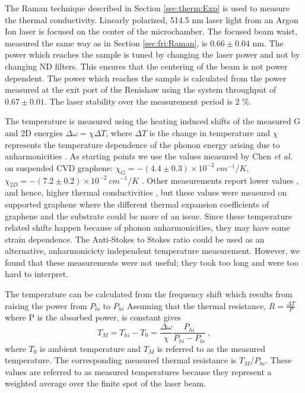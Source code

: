 The Raman technique described in Section \ref{sec:therm:Exp} is used to measure the thermal conductivity.
Linearly polarized, 514.5 nm laser light from an Argon Ion laser is focused on the center of the microchamber.
The focused beam waist, measured the same way as in Section \ref{sec:fri:Raman}, is $0.66 \pm 0.04$ nm.
The power which reaches the sample is tuned by changing the laser power and not by changing ND filters.
This ensures that the centering of the beam is not power dependent.
The power which reaches the sample is calculated from the power measured at the exit port of the Renishaw using the system throughput of $0.67 \pm 0.01$.
The laser stability over the measurement period is 2 \%.

The temperature is measured using the heating induced shifts of the measured G and 2D energies $\Delta \omega=\chi \Delta T$, where $\Delta T$ is the change in temperature and $\chi$ represents the temperature dependence of the phonon energy arising due to anharmonicities \cite{Bonini2007}.
As starting points we use the values measured by Chen \textit{et al.} on suspended CVD graphene: $\chi_G=-(4.4 \pm 0.3) \times 10^{-2} \ cm^{-1}/K$, $\chi_{2D}=-(7.2 \pm 0.2) \times 10^{-2} \ cm^{-1}/K$ \cite{Chen2011a}.
Other measurements report lower values \cite{Calizo2007}, and hence, higher thermal conductivities \cite{Balandin2008}, but these values were measured on supported graphene where the different thermal expansion coefficients of graphene and the substrate could be more of an issue.
Since these temperature related shifts happen because of phonon anharmonicities, they may have some strain dependence.
The Anti-Stokes to Stokes ratio could be used as an alternative, anharmonicicty independent temperature measurement.
However, we found that these measurements were not useful; they took too long and were too hard to interpret.

The temperature can be calculated from the frequency shift which results from raising the power from $P_{lo}$ to $P_{hi}$ 
Assuming that the thermal resistance, $R=\frac{\Delta T}{P}$ where P is the absorbed power, is constant gives
\begin{equation}
	T_M=T_{hi}-T_0=\frac{\Delta \omega}{\chi} \frac{P_{hi}}{P_{hi}-P_{lo}} \ , \label{eq:therm:TM}
\end{equation}
where $T_0$ is ambient temperature and $T_M$ is referred to as the measured temperature.
The corresponding measured thermal resistance is $T_M/P_{hi}$.
These values are referred to as measured temperatures because they represent a weighted average over the finite spot of the laser beam.

